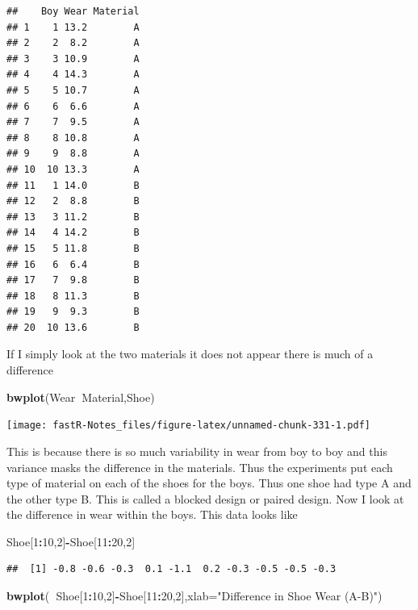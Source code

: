 \documentclass[]{book}
\newenvironment{Shaded}{\begin{snugshade}}{\end{snugshade}}
\newcommand{\KeywordTok}[1]{\textcolor[rgb]{0.13,0.29,0.53}{\textbf{#1}}}
\newcommand{\DataTypeTok}[1]{\textcolor[rgb]{0.13,0.29,0.53}{#1}}
\newcommand{\DecValTok}[1]{\textcolor[rgb]{0.00,0.00,0.81}{#1}}
\newcommand{\StringTok}[1]{\textcolor[rgb]{0.31,0.60,0.02}{#1}}
\newcommand{\OperatorTok}[1]{\textcolor[rgb]{0.81,0.36,0.00}{\textbf{#1}}}
\newcommand{\NormalTok}[1]{#1}
\theoremstyle{definition}
\theoremstyle{definition}
\theoremstyle{definition}
\theoremstyle{remark}
\begin{document}
\begin{verbatim}
##    Boy Wear Material
## 1    1 13.2        A
## 2    2  8.2        A
## 3    3 10.9        A
## 4    4 14.3        A
## 5    5 10.7        A
## 6    6  6.6        A
## 7    7  9.5        A
## 8    8 10.8        A
## 9    9  8.8        A
## 10  10 13.3        A
## 11   1 14.0        B
## 12   2  8.8        B
## 13   3 11.2        B
## 14   4 14.2        B
## 15   5 11.8        B
## 16   6  6.4        B
## 17   7  9.8        B
## 18   8 11.3        B
## 19   9  9.3        B
## 20  10 13.6        B
\end{verbatim}

If I simply look at the two materials it does not appear there is much
of a difference

\begin{Shaded}
\begin{Highlighting}[]
\KeywordTok{bwplot}\NormalTok{(Wear}\OperatorTok{~}\NormalTok{Material,Shoe)}
\end{Highlighting}
\end{Shaded}

\texttt{[image: fastR-Notes\_files/figure-latex/unnamed-chunk-331-1.pdf]}

This is because there is so much variability in wear from boy to boy and
this variance masks the difference in the materials. Thus the
experiments put each type of material on each of the shoes for the boys.
Thus one shoe had type A and the other type B. This is called a blocked
design or paired design. Now I look at the difference in wear within the
boys. This data looks like

\begin{Shaded}
\begin{Highlighting}[]
\NormalTok{Shoe[}\DecValTok{1}\OperatorTok{:}\DecValTok{10}\NormalTok{,}\DecValTok{2}\NormalTok{]}\OperatorTok{-}\NormalTok{Shoe[}\DecValTok{11}\OperatorTok{:}\DecValTok{20}\NormalTok{,}\DecValTok{2}\NormalTok{]}
\end{Highlighting}
\end{Shaded}

\begin{verbatim}
##  [1] -0.8 -0.6 -0.3  0.1 -1.1  0.2 -0.3 -0.5 -0.5 -0.3
\end{verbatim}

\begin{Shaded}
\begin{Highlighting}[]
\KeywordTok{bwplot}\NormalTok{(}\OperatorTok{~}\NormalTok{Shoe[}\DecValTok{1}\OperatorTok{:}\DecValTok{10}\NormalTok{,}\DecValTok{2}\NormalTok{]}\OperatorTok{-}\NormalTok{Shoe[}\DecValTok{11}\OperatorTok{:}\DecValTok{20}\NormalTok{,}\DecValTok{2}\NormalTok{],}\DataTypeTok{xlab=}\StringTok{"Difference in Shoe Wear (A-B)"}\NormalTok{)}
\end{Highlighting}
\end{Shaded}
\end{document}
